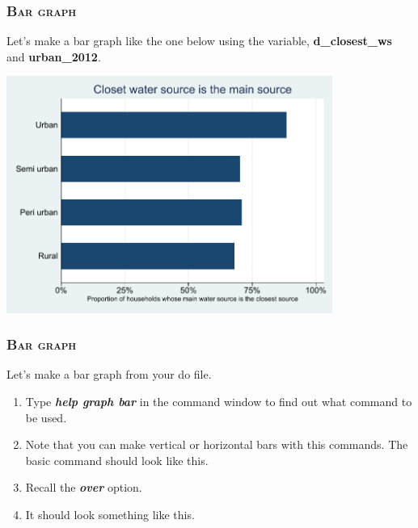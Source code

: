 \documentclass[10pt]{beamer}
\begin{document}
	\begin{frame}
	\frametitle{\textsc{Bar graph}}
		Let's make a bar graph like the one below using the variable, \textbf{d\_closest\_ws} and \textbf{urban_2012}.
		\vspace{1mm}
	
\begin{center}
    \includegraphics[width=0.8\textwidth]{bar_1.pdf}
\end{center}
	\end{frame}
	
	\begin{frame}
	\frametitle{\textsc{Bar graph}}	
		 Let's make a bar graph from your do file.
		\begin{enumerate}
			 \item Type \textbf{\textit{help graph bar}} in the command window 
				   to find out what command to be used.
			 \onslide<2-> \item Note that you can make vertical or horizontal 
								bars with this commands. The basic command should
								look like this.
		
\begin{stlog}\end{stlog}
			\vspace{1mm}
			 \item Recall the \textbf{\textit{over}} option.
			\vspace{1mm}
			\onslide<4-> \item It should look something like this.
		
\begin{stlog}\end{stlog}
		\end{enumerate}
	\end{frame}
	
\end{document}

